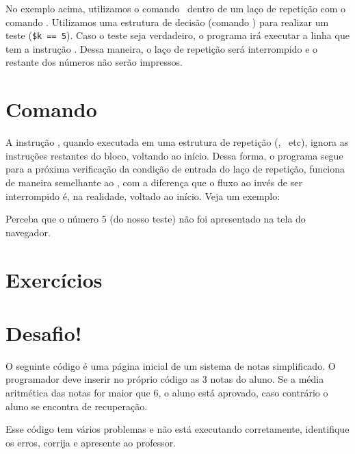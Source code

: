 

No exemplo acima, utilizamos o comando \comandobreak~dentro de um laço de repetição com
o comando \comandofor. Utilizamos uma estrutura de decisão (comando \comandoif) para
realizar um teste (\texttt{\$k == 5}). Caso o teste seja verdadeiro, o programa
irá executar a linha que tem a instrução \comandobreak. Dessa maneira, o laço de 
repetição será interrompido e o restante dos números não serão impressos.

\section{Comando \comandocontinue}
\label{comando-continue}

A instrução \comandocontinue, quando executada em uma estrutura de repetição (\comandofor, 
\comandowhile~etc), ignora as instruções restantes do bloco, voltando ao início. Dessa 
forma, o programa segue para a próxima verificação da condição de entrada do laço de repetição, 
funciona de maneira semelhante ao \comandobreak, com a diferença que o fluxo ao invés 
de ser interrompido é, na realidade, voltado ao início. Veja um exemplo:



Perceba que o número 5 (do nosso teste) não foi apresentado na tela do navegador.

\section{Exercícios}
\label{cap5-exercicios}

\section{Desafio!}
\label{cap5-desafio}
O seguinte código é uma página inicial de um sistema de notas simplificado.
O programador deve inserir no próprio código as 3 notas do aluno. Se a média aritmética 
das notas for maior que 6, o aluno está aprovado, caso contrário o aluno se encontra de 
recuperação.

Esse código tem vários problemas e não está executando corretamente, identifique os erros, 
corrija e apresente ao professor.

